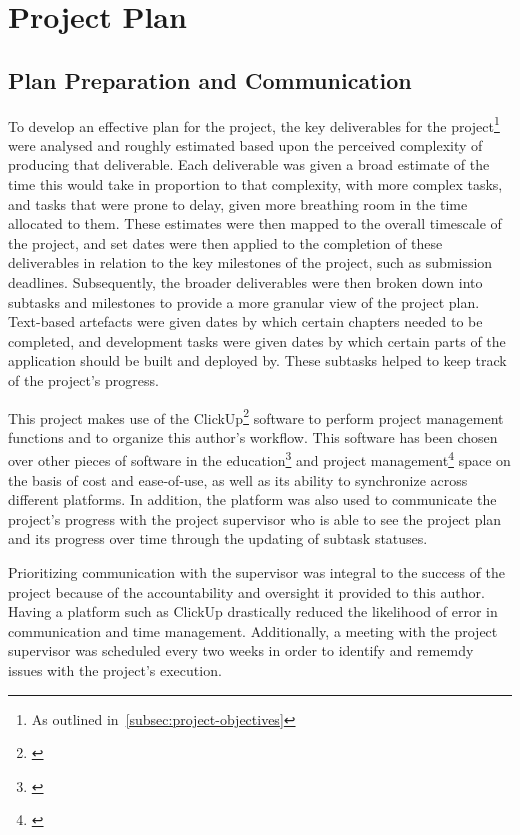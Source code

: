 
\thispagestyle{plain}
\newpage
\section{Project Plan}\label{sec:project-plan}

\normalsize

\subsection{Plan Preparation and Communication}\label{subsec:plan-preparation-and-communication}

To develop an effective plan for the project, the key deliverables for the project\footnote{As outlined in~\ref{subsec:project-objectives}} were analysed and roughly estimated based upon the perceived complexity of producing that deliverable.
Each deliverable was given a broad estimate of the time this would take in proportion to that complexity, with more complex tasks, and tasks that were prone to delay, given more breathing room in the time allocated to them.
These estimates were then mapped to the overall timescale of the project, and set dates were then applied to the completion of these deliverables in relation to the key milestones of the project, such as submission deadlines.
Subsequently, the broader deliverables were then broken down into subtasks and milestones to provide a more granular view of the project plan.
Text-based artefacts were given dates by which certain chapters needed to be completed, and development tasks were given dates by which certain parts of the application should be built and deployed by.
These subtasks helped to keep track of the project’s progress.

This project makes use of the ClickUp\footnote{\citep{clickup}} software to perform project management functions and to organize this author’s workflow.
This software has been chosen over other pieces of software in the education\footnote{\citep{education_software}} and project management\footnote{\citep{pm_software}} space on the basis of cost and ease-of-use, as well as its ability to synchronize across different platforms.
In addition, the platform was also used to communicate the project's progress with the project supervisor who is able to see the project plan and its progress over time through the updating of subtask statuses.

Prioritizing communication with the supervisor was integral to the success of the project because of the accountability and oversight it provided to this author.
Having a platform such as ClickUp drastically reduced the likelihood of error in communication and time management.
Additionally, a meeting with the project supervisor was scheduled every two weeks in order to identify and rememdy issues with the project's execution.

